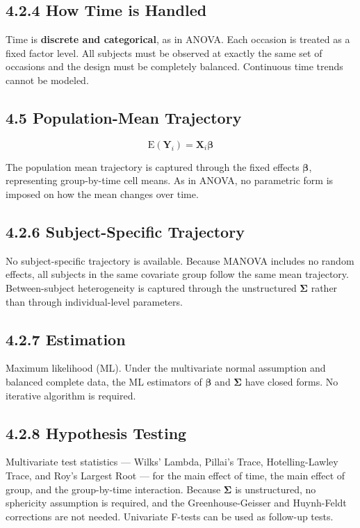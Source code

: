 \documentclass[11pt]{article}
\newcommand{\bY}{\mathbf{Y}}
\newcommand{\bX}{\mathbf{X}}
\newcommand{\bbeta}{\boldsymbol{\beta}}
\newcommand{\bSigma}{\boldsymbol{\Sigma}}
\newcommand{\E}{\mathrm{E}}
\begin{document}
\subsection*{4.2.4 How Time is Handled}

Time is \textbf{discrete and categorical}, as in ANOVA. Each occasion is treated as a fixed factor level. All subjects must be observed at exactly the same set of occasions and the design must be completely balanced. Continuous time trends cannot be modeled.

\subsection*{4.5 Population-Mean Trajectory}

$$\E(\bY_i) = \bX_i \bbeta$$

The population mean trajectory is captured through the fixed effects $\bbeta$, representing group-by-time cell means. As in ANOVA, no parametric form is imposed on how the mean changes over time.

\subsection*{4.2.6 Subject-Specific Trajectory}

No subject-specific trajectory is available. Because MANOVA includes no random effects, all subjects in the same covariate group follow the same mean trajectory. Between-subject heterogeneity is captured through the unstructured $\bSigma$ rather than through individual-level parameters.

\subsection*{4.2.7 Estimation}

Maximum likelihood (ML). Under the multivariate normal assumption and balanced complete data, the ML estimators of $\bbeta$ and $\bSigma$ have closed forms. No iterative algorithm is required.

\subsection*{4.2.8 Hypothesis Testing}

Multivariate test statistics --- Wilks' Lambda, Pillai's Trace, Hotelling-Lawley Trace, and Roy's Largest Root --- for the main effect of time, the main effect of group, and the group-by-time interaction. Because $\bSigma$ is unstructured, no sphericity assumption is required, and the Greenhouse-Geisser and Huynh-Feldt corrections are not needed. Univariate F-tests can be used as follow-up tests.
\end{document}
